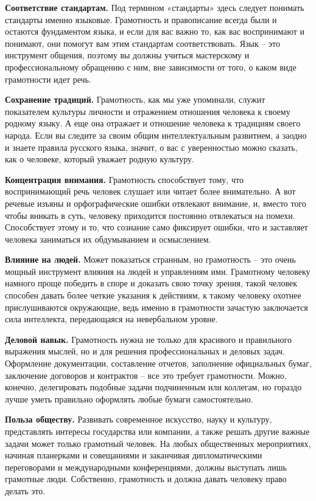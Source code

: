 \textbf{Соответствие стандартам.} Под термином «стандарты» здесь следует понимать стандарты именно языковые. Грамотность и правописание всегда были и остаются фундаментом языка, и если для вас важно то, как вас воспринимают и понимают, они помогут вам этим стандартам соответствовать. Язык – это инструмент общения, поэтому вы должны учиться мастерскому и профессиональному обращению с ним, вне зависимости от того, о каком виде грамотности идет речь.

\textbf{Сохранение традиций.} Грамотность, как мы уже упоминали, служит показателем культуры личности и отражением отношения человека к своему родному языку. А еще она отражает и отношение человека к традициям своего народа. Если вы следите за своим общим интеллектуальным развитием, а заодно и знаете правила русского языка, значит, о вас с уверенностью можно сказать, как о человеке, который уважает родную культуру.

\textbf{Концентрация внимания.} Грамотность способствует тому, что воспринимающий речь человек слушает или читает более внимательно. А вот речевые изъяны и орфографические ошибки отвлекают внимание, и, вместо того чтобы вникать в суть, человеку приходится постоянно отвлекаться на помехи. Способствует этому и то, что сознание само фиксирует ошибки, что и заставляет человека заниматься их обдумыванием и осмыслением.

\textbf{Влияние на людей.} Может показаться странным, но грамотность – это очень мощный инструмент влияния на людей и управлениям ими. Грамотному человеку намного проще победить в споре и доказать свою точку зрения, такой человек способен давать более четкие указания к действиям, к такому человеку охотнее прислушиваются окружающие, ведь именно в грамотности зачастую заключается сила интеллекта, передающаяся на невербальном уровне.

\textbf{Деловой навык.} Грамотность нужна не только для красивого и правильного выражения мыслей, но и для решения профессиональных и деловых задач. Оформление документации, составление отчетов, заполнение официальных бумаг, заключение договоров и контрактов – все это требует грамотности. Можно, конечно, делегировать подобные задачи подчиненным или коллегам, но гораздо лучше уметь правильно оформлять любые бумаги самостоятельно.

\textbf{Польза обществу.} Развивать современное искусство, науку и культуру, представлять интересы государства или компании, а также решать другие важные задачи может только грамотный человек. На любых общественных мероприятиях, начиная планерками и совещаниями и заканчивая дипломатическими переговорами и международными конференциями, должны выступать лишь грамотные люди. Собственно, грамотность и должна давать человеку право делать это.

